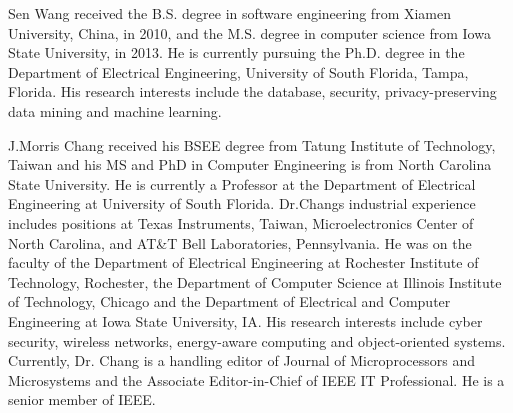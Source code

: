 \documentclass[10pt,journal,compsoc]{IEEEtran}
\begin{document}
\begin{IEEEbiography}{Sen Wang}
received the B.S. degree in software engineering from Xiamen University, China, in 2010, and the M.S. degree in computer science from Iowa State University, in 2013. He is currently pursuing the Ph.D. degree in the Department of Electrical Engineering, University of South Florida, Tampa, Florida. His research interests include the database, security, privacy-preserving data mining and machine learning.
\end{IEEEbiography}
\iffalse
\begin{IEEEbiography}[{\texttt{[image: Bio1-Emre]}}]{Emre Yilmaz} received the BS degree in computer science and engineering from Sabanci University, Istanbul, Turkey, in 2008 and the MS degree in computer science from ETH Zurich, Switzerland, in 2010. He received the PhD degree in computer engineering at Bilkent University, Ankara, Turkey, in 2017. He is currently a research associate with Case Western Reserve University. Before that, he was a postdoctoral researcher with University of South Florida. His research interests include data privacy, cryptography, and big data analytics.
\end{IEEEbiography}
\fi
\begin{IEEEbiography}{J.Morris Chang} received his BSEE degree from Tatung Institute of Technology, Taiwan and his MS and PhD in Computer Engineering is from North Carolina State University. He is currently a Professor at the Department of Electrical Engineering at University of South Florida. Dr.Changs industrial experience includes positions at Texas Instruments, Taiwan, Microelectronics Center of North Carolina, and AT\&T Bell Laboratories, Pennsylvania. He was on the faculty of the Department of Electrical Engineering at Rochester Institute of Technology, Rochester, the Department of Computer Science at Illinois Institute of Technology, Chicago and the Department of Electrical and Computer Engineering at Iowa State University, IA. His research interests include cyber security, wireless networks, energy-aware computing and object-oriented systems. Currently, Dr. Chang is a handling editor of Journal of Microprocessors and Microsystems and the Associate Editor-in-Chief of IEEE IT Professional. He is a senior member of IEEE.
\end{IEEEbiography}
\iffalse
\begin{IEEEbiographynophoto}{John Doe}
Biography text here.
\end{IEEEbiographynophoto}



\begin{IEEEbiographynophoto}{Jane Doe}
Biography text here.
\end{IEEEbiographynophoto}

\fi
\end{document}

